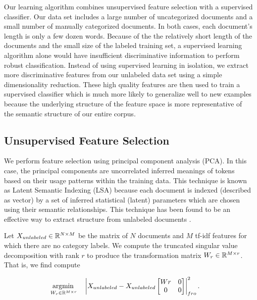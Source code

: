 Our learning algorithm combines unsupervised feature selection with a supervised classifier. Our
data set includes a large number of uncategorized documents and a small number of manually
categorized documents. In both cases, each document's length is only a few dozen words. Because of
the the relatively short length of the documents and the small size of the labeled training set, a
supervised learning algorithm alone would have insufficient discriminative information to perform
robust classification. Instead of using supervised learning in isolation, we extract more
discriminative features from our unlabeled data set using a simple dimensionality reduction.  These
high quality features are then used to train a supervised classifier which is much more likely to
generalize well to new examples because the underlying structure of the feature space is more
representative of the semantic structure of our entire corpus.

\subsection{Unsupervised Feature Selection}
\newcommand{\Xu}{X_{unlabeled}}
\newcommand{\Xl}{X_{labeled}}
\newcommand{\tX}{\tilde{X}}
\newcommand{\tXl}{\tilde{X}_{labeled}}
We perform feature selection using principal component analysis (PCA). In this case, the principal
components are uncorrelated inferred meanings of tokens based on their usage patterns within the
training data. This technique is known as Latent Semantic Indexing (LSA) because each document is
indexed (described as vector) by a set of inferred statistical (latent) parameters which are chosen
using their semantic relationships. This technique has been found to be an effective way to extract
structure from unlabeled documents \cite{sun2004supervised}.

Let $\Xu \in \RR^{N \times M}$ be the matrix of $N$ documents and $M$ tf-idf features for which
there are no category labels. We compute the truncated singular value decomposition with rank $r$ to
produce the transformation matrix $W_r \in \mathbb{R}^{M \times r}$. That is, we find compute

\begin{equation}
\begin{aligned}
\underset{W_r \in \RR^{M \times r}}{\argmin} \quad & \left| \Xu - \Xu \begin{bmatrix}Wr & 0 \\ 0 & 0\end{bmatrix} \right|_{fro}^2.
\end{aligned}
\end{equation}


